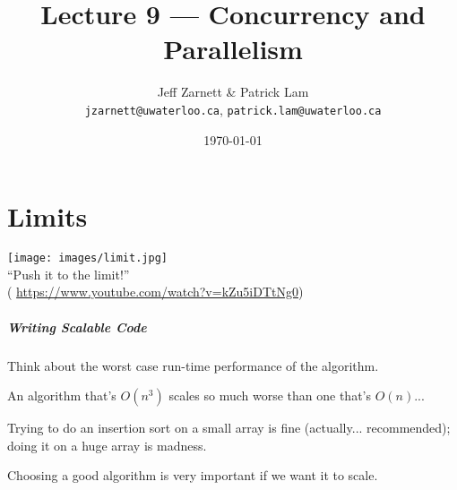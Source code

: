 

\title{Lecture 9 --- Concurrency and Parallelism }

\author{Jeff Zarnett \& Patrick Lam \\ \small \texttt{jzarnett@uwaterloo.ca}, \texttt{patrick.lam@uwaterloo.ca}}
\date{\today}



\begin{frame}
  \titlepage

 \end{frame}

\part{Limits}
\begin{frame}
\partpage
\begin{center}
	\texttt{[image: images/limit.jpg]}\\
	``Push it to the limit!''\\
	( \url{https://www.youtube.com/watch?v=kZu5iDTtNg0})
\end{center}
\end{frame}

\begin{frame}
\frametitle{Writing Scalable Code}

Think about the worst case run-time performance of the algorithm. 

An algorithm that's $O(n^{3})$ scales so much worse than one that's $O(n)$... 

Trying to do an insertion sort on a small array is fine (actually... recommended); doing it on a huge array is madness.

Choosing a good algorithm is very important if we want it to scale. 

\end{frame}

